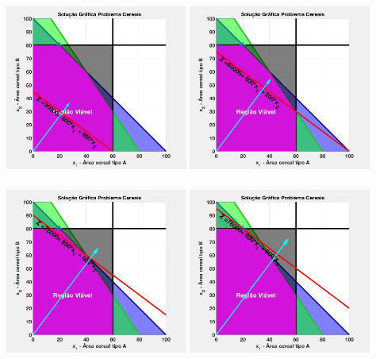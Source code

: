\documentclass{beamer}
\begin{document}
\begin{frame}
\begin{columns}
\begin{column}{0.5\textwidth}
			\only<4-6> {\includegraphics[width=6cm,height=6cm]{MatLab/anima_19.png} }
			\only<7> {\includegraphics[width=6cm,height=6cm]{MatLab/anima_20.png} }
			\only<8> {\includegraphics[width=6cm,height=6cm]{MatLab/anima_21.png} }
			\only<9-11> {\includegraphics[width=6cm,height=6cm]{MatLab/anima_22.png} }
		\end{column}
	\end{columns}
\end{frame}
\end{document}
